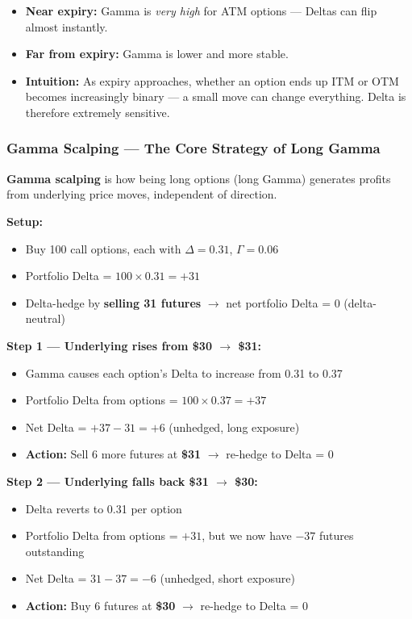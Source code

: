 \documentclass[12pt,openany]{book}
\begin{document}
\begin{itemize}[leftmargin=*]
    \item \textbf{Near expiry:} Gamma is \emph{very high} for ATM options — Deltas can flip almost instantly.
    \item \textbf{Far from expiry:} Gamma is lower and more stable.
    \item \textbf{Intuition:} As expiry approaches, whether an option ends up ITM or OTM becomes increasingly binary — a small move can change everything. Delta is therefore extremely sensitive.
\end{itemize}

\subsubsection{Gamma Scalping — The Core Strategy of Long Gamma}

\textbf{Gamma scalping} is how being long options (long Gamma) generates profits from underlying price moves, independent of direction.

\textbf{Setup:}
\begin{itemize}[leftmargin=*]
    \item Buy 100 call options, each with \(\Delta = 0.31\), \(\Gamma = 0.06\)
    \item Portfolio Delta = \(100 \times 0.31 = +31\)
    \item Delta-hedge by \textbf{selling 31 futures} \(\rightarrow\) net portfolio Delta = 0 (delta-neutral)
\end{itemize}

\textbf{Step 1 — Underlying rises from \$30 \(\rightarrow\) \$31:}
\begin{itemize}[leftmargin=*]
    \item Gamma causes each option's Delta to increase from 0.31 to 0.37
    \item Portfolio Delta from options = \(100 \times 0.37 = +37\)
    \item Net Delta = \(+37 - 31 = +6\) (unhedged, long exposure)
    \item \textbf{Action:} Sell 6 more futures at \textbf{\$31} \(\rightarrow\) re-hedge to Delta = 0
\end{itemize}

\textbf{Step 2 — Underlying falls back \$31 \(\rightarrow\) \$30:}
\begin{itemize}[leftmargin=*]
    \item Delta reverts to 0.31 per option
    \item Portfolio Delta from options = \(+31\), but we now have \(-37\) futures outstanding
    \item Net Delta = \(31 - 37 = -6\) (unhedged, short exposure)
    \item \textbf{Action:} Buy 6 futures at \textbf{\$30} \(\rightarrow\) re-hedge to Delta = 0
\end{itemize}
\end{document}
